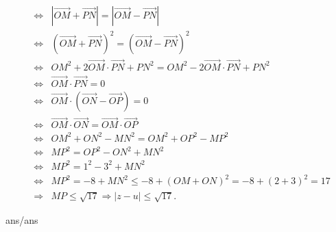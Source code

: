 \begin{ex}
{{\begin{eqnarray*}
				&\Leftrightarrow& \left|\overrightarrow{OM}+\overrightarrow{PN}\right| = \left|\overrightarrow{OM}-\overrightarrow{PN}\right|\\
				&\Leftrightarrow& \left(\overrightarrow{OM}+\overrightarrow{PN}\right)^2=\left(\overrightarrow{OM}-\overrightarrow{PN}\right)^2\\
				&\Leftrightarrow& OM^2 + 2\overrightarrow{OM}\cdot\overrightarrow{PN} +PN^2=OM^2-2\overrightarrow{OM}\cdot\overrightarrow{PN}+PN^2\\
				&\Leftrightarrow& \overrightarrow{OM}\cdot\overrightarrow{PN}=0\\
				&\Leftrightarrow& \overrightarrow{OM}\cdot\left(\overrightarrow{ON}-\overrightarrow{OP}\right)=0\\
				&\Leftrightarrow& \overrightarrow{OM}\cdot \overrightarrow{ON} = \overrightarrow{OM}\cdot\overrightarrow{OP}\\
				&\Leftrightarrow& OM^2+ON^2-MN^2=OM^2+OP^2-MP^2\\
				&\Leftrightarrow& MP^2=OP^2-ON^2+MN^2\\
				&\Leftrightarrow& MP^2=1^2-3^2+MN^2\\
				&\Leftrightarrow& MP^2=-8+MN^2 \leq -8+(OM+ON)^2 =-8+(2+3)^2=17\\
				&\Rightarrow& MP \leq \sqrt{17} \Rightarrow |z-u|\leq \sqrt{17}.
			\end{eqnarray*}
		}		
	}
\end{ex}

\begin{indapan}
	{ans/ans\currfilebase}
\end{indapan}